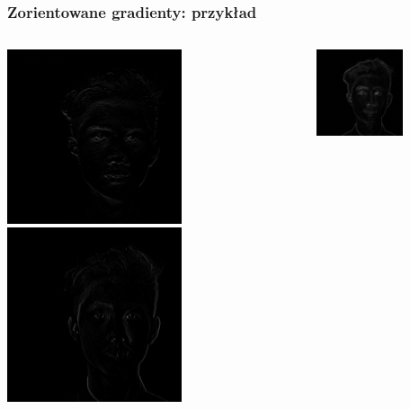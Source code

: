 \documentclass{beamer}
\begin{document}
            \begin{frame}
                \frametitle{Zorientowane gradienty: przykład}
                \begin{columns}
                    \begin{column}{0.5\textwidth}
                        \begin{center}
                            \includegraphics[width=0.6\textwidth]{pictures/x_sobel}
                            \includegraphics[width=0.6\textwidth]{pictures/y_sobel}
                        \end{center}
                    \end{column}
                    \begin{column}{0.5\textwidth}
                        \begin{center}
                            \includegraphics[width=0.6\textwidth]{pictures/magnitude}

\end{center}
\end{column}
\end{columns}
\end{frame}
\end{document}
